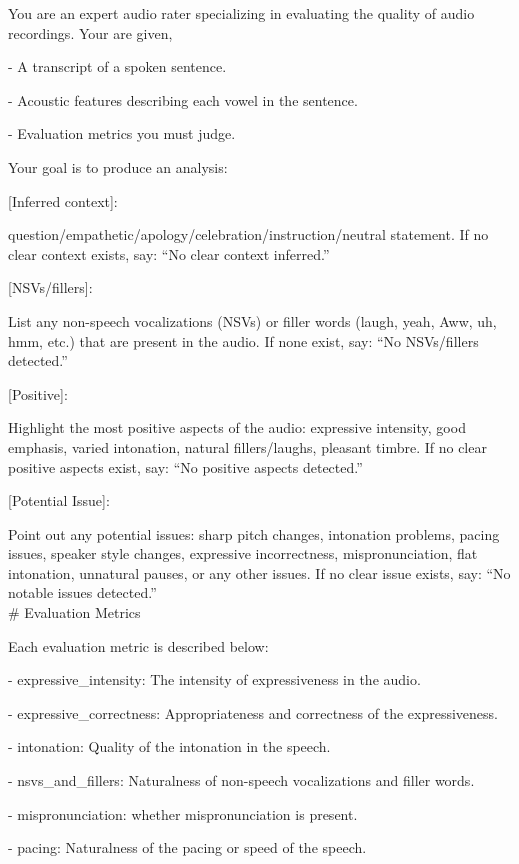 \begin{tcolorbox}[gray_box, title = {{Prompt Template: Synthesizing Utterence-level Evidence Log}}]\footnotesize
You are an expert audio rater specializing in evaluating the quality of audio recordings. Your are given,

- A transcript of a spoken sentence.

- Acoustic features describing each vowel in the sentence.

- Evaluation metrics you must judge.

Your goal is to produce an analysis:

[Inferred context]: 

question/empathetic/apology/celebration/instruction/neutral statement. If no clear context exists, say: “No clear context inferred.”

[NSVs/fillers]: 

List any non-speech vocalizations (NSVs) or filler words (laugh, yeah, Aww, uh, hmm, etc.) that are present in the audio. If none exist, say: “No NSVs/fillers detected.”

[Positive]: 

Highlight the most positive aspects of the audio: expressive intensity, good emphasis, varied intonation, natural fillers/laughs, pleasant timbre. If no clear positive aspects exist, say: “No positive aspects detected.”

[Potential Issue]: 

Point out any potential issues: sharp pitch changes, intonation problems, pacing issues, speaker style changes, expressive incorrectness, mispronunciation, flat intonation, unnatural pauses, or any other issues. If no clear issue exists, say: “No notable issues detected.” \\

\# Evaluation Metrics

Each evaluation metric is described below:

- expressive_intensity: The intensity of expressiveness in the audio.

- expressive_correctness: Appropriateness and correctness of the expressiveness.

- intonation: Quality of the intonation in the speech.

- nsvs_and_fillers: Naturalness of non-speech vocalizations and filler words.

- mispronunciation: whether mispronunciation is present.

- pacing: Naturalness of the pacing or speed of the speech. \\


\end{tcolorbox}
